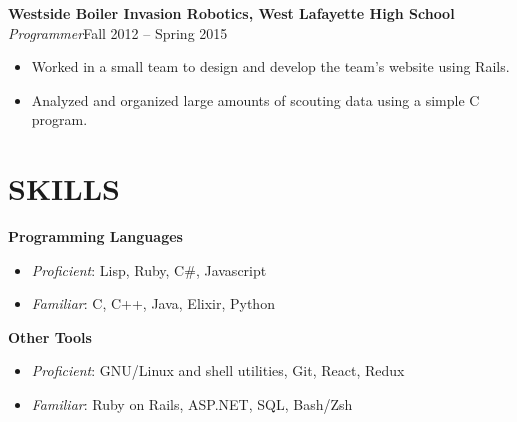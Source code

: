 \documentclass[line,margin]{res}
\begin{document}
\begin{resume}
  {\bf\rmfamily  Westside Boiler Invasion Robotics, West Lafayette High School}\\
  \emph{Programmer}\hfill Fall 2012 -- Spring 2015
  \begin{itemize}  \itemsep -2pt %
  \item Worked in a small team to design and develop the team's website using Rails.
  \item Analyzed and organized large amounts of scouting data using a simple C program.
  \end{itemize}





  \section{SKILLS}
  {\bf\rmfamily Programming Languages}
  \begin{itemize} \itemsep -2pt
  \item \emph{Proficient}: Lisp, Ruby, C\#, Javascript
  \item \emph{Familiar}: C, C++, Java, Elixir, Python
  \end{itemize}

  {\bf\rmfamily Other Tools}
  \begin{itemize} \itemsep -2pt
  \item \emph{Proficient}: GNU/Linux and shell utilities, Git, React, Redux%
  \item \emph{Familiar}: Ruby on Rails, ASP.NET, SQL, Bash/Zsh
  \end{itemize}


\end{resume}
\end{document}
